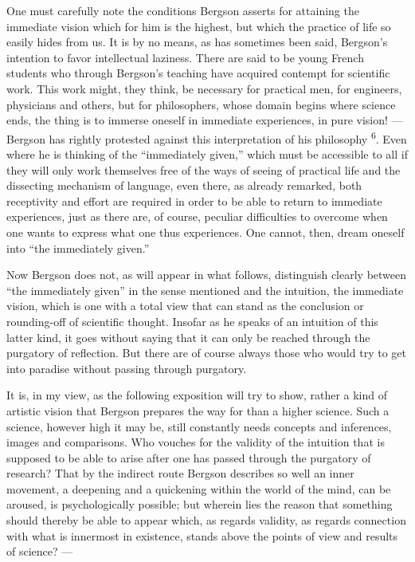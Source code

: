 \documentclass[12pt,a4paper,openany]{book}
\newcommand{\opage}[1]{\marginnote{\footnotesize\textit{[#1]}}}
\newcommand{\nm}[1]{\unskip\textsuperscript{#1}}
\begin{document}
One must carefully note the conditions Bergson asserts for attaining the immediate vision which for him is the highest, but which the practice of life so easily hides from us. It is by no means, as has sometimes been said, Bergson's intention to favor intellectual laziness. There are said to be young French students who through Bergson's teaching have acquired contempt for scientific work. This work might, they think, be necessary for practical men, for engineers, physicians and others, but for philosophers, whose domain begins where science ends, the thing is to immerse oneself in immediate experiences, in
\opage{8}pure vision! --- Bergson has rightly protested against this interpretation of his philosophy \nm{6}. Even where he is thinking of the ``immediately given,'' which must be accessible to all if they will only work themselves free of the ways of seeing of practical life and the dissecting mechanism of language, even there, as already remarked, both receptivity and effort are required in order to be able to return to immediate experiences, just as there are, of course, peculiar difficulties to overcome when one wants to express what one thus experiences. One cannot, then, dream oneself into ``the immediately given.''

Now Bergson does not, as will appear in what follows, distinguish clearly between ``the immediately given'' in the sense mentioned and the intuition, the immediate vision, which is one with a total view that can stand as the conclusion or rounding-off of scientific thought. Insofar as he speaks of an intuition of this latter kind, it goes without saying that it can only be reached through the purgatory of reflection. But there are of course always those who would try to get into paradise without passing through purgatory.

It is, in my view, as the following exposition will try to show, rather a kind of artistic vision that Bergson prepares the way for than a higher science. Such a science, however high it may be, still constantly needs concepts and inferences, images and comparisons. Who vouches for the validity of the intuition that is supposed to be able to arise after one has passed through the purgatory of research? That by the indirect route Bergson describes so well an inner movement, a deepening and a quickening within the world of the mind, can be aroused, is psychologically possible; but wherein lies the reason that something should thereby be able to appear which, as regards validity, as regards connection with what is innermost in existence, stands above the points of view and results of science? ---
\end{document}
